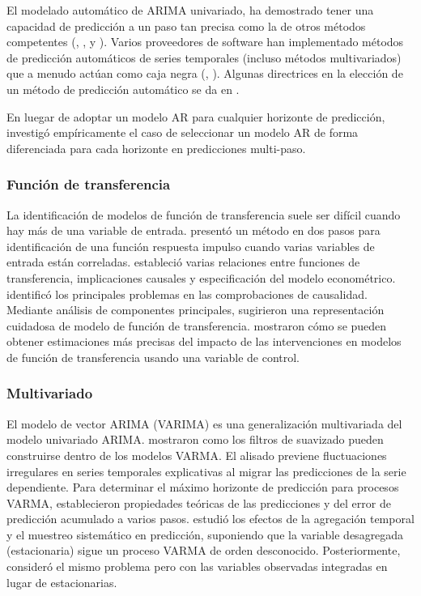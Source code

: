 \documentclass{llncs}
\begin{document}
El modelado automático de ARIMA univariado, ha demostrado tener una capacidad de predicción a un paso tan precisa como la de otros métodos competentes (\cite{Hill1984319}, \cite{Libert1984325}, \cite{Poulos1987261} y \cite{Texter1989209}). Varios proveedores de software han implementado métodos de predicción automáticos de series temporales (incluso métodos multivariados) que a menudo actúan como caja negra (\cite{Geriner1991127}, \cite{Tashman2000437}). Algunas directrices en la elección de un método de predicción automático se da en \cite{Chatfield198819}.

En luegar de adoptar un modelo AR para cualquier horizonte de predicción, \cite{Kang2003387} investigó empíricamente el caso de seleccionar un modelo AR de forma diferenciada para cada horizonte en predicciones multi-paso.

\subsubsection{Función de transferencia}
La identificación de modelos de función de transferencia suele ser difícil cuando hay más de una variable de entrada. \cite{Edlund1984297} presentó un método en dos pasos para identificación de una función respuesta impulso cuando varias variables de entrada están correladas. \cite{Koreisha1983151} estableció varias relaciones entre funciones de transferencia, implicaciones causales y especificación del modelo econométrico. \cite{Gupta1987195} identificó los principales problemas en las comprobaciones de causalidad. Mediante análisis de componentes principales, \cite{DelMoral1997237} sugirieron una representación cuidadosa de modelo de función de transferencia. \cite{Krishnamurthi198921} mostraron cómo se pueden obtener estimaciones más precisas del impacto de las intervenciones en modelos de función de transferencia usando una variable de control.


\subsubsection{Multivariado}
El modelo de vector ARIMA (VARIMA) es una generalización multivariada del modelo univariado ARIMA. \cite{Riise1984309} mostraron como los filtros de suavizado pueden construirse dentro de los modelos VARMA. El alisado previene fluctuaciones irregulares en series temporales explicativas al migrar las predicciones de la serie dependiente. Para determinar el máximo horizonte de predicción para procesos VARMA, \cite{DeGooijer1992135} establecieron propiedades teóricas de las predicciones y del error de predicción acumulado a varios pasos. \cite{Lutkepohl1986461} estudió los efectos de la agregación temporal y el muestreo sistemático en predicción, suponiendo que la variable desagregada (estacionaria) sigue un proceso VARMA de orden desconocido. Posteriormente, \cite{Bidarkota1998457} consideró el mismo problema pero con las variables observadas integradas en lugar de estacionarias.
\end{document}
